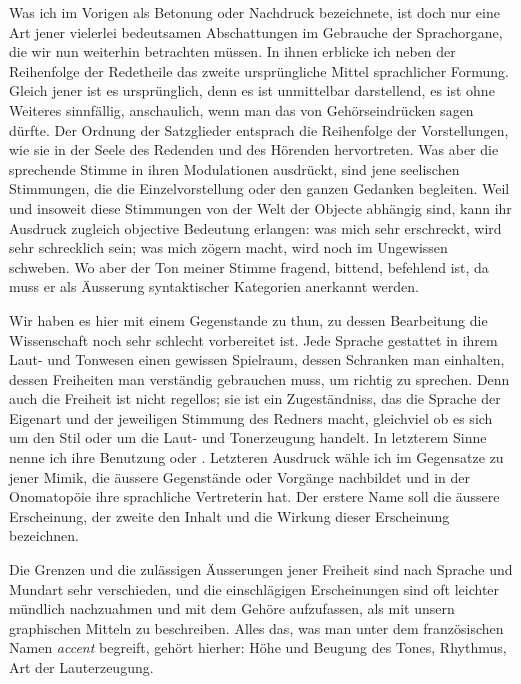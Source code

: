 \largerpage[1]Was ich im Vorigen als Betonung oder Nachdruck bezeichnete, ist doch nur eine Art jener vielerlei bedeutsamen Abschattungen im Gebrauche der Sprachorgane, die wir nun weiterhin betrachten müssen. In ihnen erblicke ich neben der Reihenfolge der Redetheile das zweite ursprüngliche Mittel sprachlicher Formung. Gleich jener ist es ursprünglich, denn es ist unmittelbar darstellend, es ist ohne Weiteres sinnfällig, \label{fp.361} anschaulich, wenn man das von Gehörseindrücken sagen dürfte. Der Ordnung der Satzglieder entsprach die Reihenfolge der Vorstellungen, wie sie in der Seele des Redenden und des Hörenden hervortreten. Was aber die sprechende Stimme in ihren Modulationen ausdrückt, sind jene seelischen Stimmungen, die die Einzelvorstellung oder den ganzen Gedanken begleiten. Weil und insoweit diese Stimmungen von der Welt der Objecte abhängig sind, kann ihr Ausdruck  zugleich objective Bedeutung erlangen: was mich sehr erschreckt, wird sehr schrecklich sein; was mich zögern macht, wird noch im Ungewissen schweben. Wo aber der Ton meiner Stimme fragend, bittend, befehlend ist, da muss er als  Äusserung syntaktischer Kategorien anerkannt werden.

Wir haben es hier mit einem Gegenstande zu thun, zu dessen Bearbeitung die Wissenschaft noch sehr schlecht vorbereitet ist. Jede Sprache gestattet in ihrem Laut- und Tonwesen einen gewissen Spielraum, dessen Schranken man \label{sp.377} einhalten, dessen Freiheiten man verständig gebrauchen muss, um richtig zu sprechen. Denn auch die Freiheit ist nicht regellos; sie ist ein Zugeständniss, das die Sprache der Eigenart und der jeweiligen Stimmung des Redners macht, gleichviel ob es sich um den Stil oder um die Laut- und Tonerzeugung handelt. In letzterem Sinne nenne ich ihre Benutzung  oder . Letzteren Ausdruck wähle ich im Gegensatze zu jener Mimik, die äussere Gegenstände oder Vorgänge nachbildet und in der Onomatopöie ihre sprachliche Vertreterin hat. Der erstere Name soll die äussere Erscheinung, der zweite den Inhalt und die Wirkung dieser Erscheinung bezeichnen.

Die Grenzen und die zulässigen Äusserungen jener Freiheit sind nach Sprache und Mundart sehr verschieden, und die einschlägigen Erscheinungen sind oft leichter mündlich nachzuahmen und mit dem Gehöre aufzufassen, als mit unsern graphischen Mitteln zu beschreiben. Alles das, was man unter dem französischen Namen \textit{accent} begreift, gehört hierher: Höhe und Beugung des Tones, Rhythmus, Art der Lauterzeugung. 

